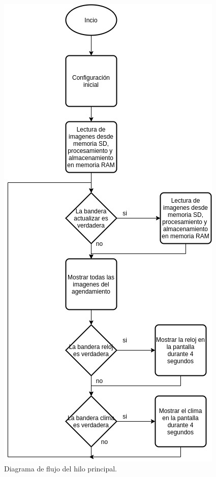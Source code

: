 \begin{figure}[htpb]
	\centering
	\includegraphics[scale=0.6]{Figures/hilo1.jpg} 
	\caption{Diagrama de flujo del hilo principal.}
	\label{fig: hiloprincipal}
\end{figure}


